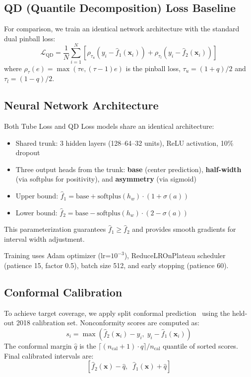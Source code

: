\documentclass[conference]{IEEEtran}
\begin{document}
\subsection{QD (Quantile Decomposition) Loss Baseline}

For comparison, we train an identical network architecture with the standard dual pinball loss:
\begin{equation}
\mathcal{L}_{\text{QD}} = \frac{1}{N}\sum_{i=1}^{N} \left[ \rho_{\tau_u}(y_i - \hat{f}_1(\mathbf{x}_i)) + \rho_{\tau_l}(y_i - \hat{f}_2(\mathbf{x}_i)) \right]
\end{equation}
where $\rho_\tau(e) = \max(\tau e, (\tau-1)e)$ is the pinball loss, $\tau_u = (1+q)/2$ and $\tau_l = (1-q)/2$.

\subsection{Neural Network Architecture}

Both Tube Loss and QD Loss models share an identical architecture:
\begin{itemize}
    \item Shared trunk: 3 hidden layers (128--64--32 units), ReLU activation, 10\% dropout
    \item Three output heads from the trunk: \textbf{base} (center prediction), \textbf{half-width} (via softplus for positivity), and \textbf{asymmetry} (via sigmoid)
    \item Upper bound: $\hat{f}_1 = \text{base} + \text{softplus}(h_w) \cdot (1 + \sigma(a))$
    \item Lower bound: $\hat{f}_2 = \text{base} - \text{softplus}(h_w) \cdot (2 - \sigma(a))$
\end{itemize}
This parameterization guarantees $\hat{f}_1 \geq \hat{f}_2$ and provides smooth gradients for interval width adjustment.

Training uses Adam optimizer (lr=$10^{-3}$), ReduceLROnPlateau scheduler (patience 15, factor 0.5), batch size 512, and early stopping (patience 60).

\subsection{Conformal Calibration}

To achieve target coverage, we apply split conformal prediction~\cite{vovk2005} using the held-out 2018 calibration set. Nonconformity scores are computed as:
\begin{equation}
    s_i = \max\left(\hat{f}_2(\mathbf{x}_i) - y_i, \; y_i - \hat{f}_1(\mathbf{x}_i)\right)
\end{equation}
The conformal margin $\hat{q}$ is the $\lceil (n_{\text{cal}}+1) \cdot q \rceil / n_{\text{cal}}$ quantile of sorted scores. Final calibrated intervals are:
\begin{equation}
    \left[\hat{f}_2(\mathbf{x}) - \hat{q}, \;\; \hat{f}_1(\mathbf{x}) + \hat{q}\right]
\end{equation}
\end{document}
